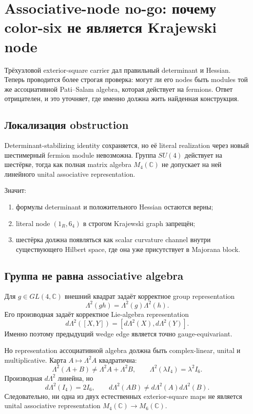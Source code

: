 \chapter{Associative-node no-go: почему color-six не является Krajewski node}

Трёхузловой exterior-square carrier дал правильный determinant и Hessian.
Теперь проводится более строгая проверка: могут ли его nodes быть modules
той же ассоциативной Pati--Salam algebra, которая действует на fermions.
Ответ отрицателен, и это уточняет, где именно должна жить найденная
конструкция.

\section{Локализация obstruction}

Determinant-stabilizing identity сохраняется, но её literal realization через
новый шестимерный fermion module невозможна. Группа \(SU(4)\) действует на
шестёрке, тогда как полная matrix algebra \(M_4(\mathbb C)\) не допускает на
ней линейного unital associative representation.

Значит:
\begin{enumerate}
 \item формулы determinant и положительного Hessian остаются верны;
 \item literal node \((1_R,6_4)\) в строгом Krajewski graph запрещён;
 \item шестёрка должна появляться как scalar curvature channel внутри
 существующего Hilbert space, где она уже присутствует в Majorana block.
\end{enumerate}

\section{Группа не равна associative algebra}

Для \(g\in GL(4,\mathbb C)\) внешний квадрат задаёт корректное group
representation
\begin{equation}
 \Lambda^2(gh)=\Lambda^2(g)\Lambda^2(h).
\end{equation}
Его производная задаёт корректное Lie-algebra representation
\begin{equation}
 d\Lambda^2([X,Y])
 =[d\Lambda^2(X),d\Lambda^2(Y)].
\end{equation}
Именно поэтому предыдущий wedge edge является точно gauge-equivariant.

Но representation ассоциативной algebra должна быть complex-linear,
unital и multiplicative. Карта \(A\mapsto\Lambda^2A\) квадратична:
\begin{equation}
 \Lambda^2(A+B)\ne\Lambda^2A+\Lambda^2B,
 \qquad
 \Lambda^2(\lambda I_4)=\lambda^2I_6.
\end{equation}
Производная \(d\Lambda^2\) линейна, но
\begin{equation}
 d\Lambda^2(I_4)=2I_6,
 \qquad
 d\Lambda^2(AB)\ne d\Lambda^2(A)d\Lambda^2(B).
\end{equation}
Следовательно, ни одна из двух естественных exterior-square maps не является
unital associative representation \(M_4(\mathbb C)\to M_6(\mathbb C)\).

